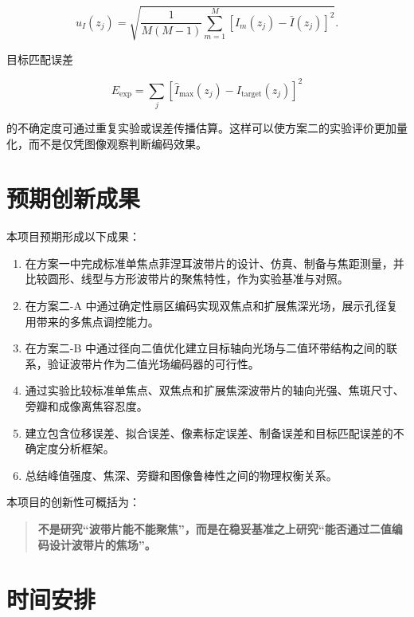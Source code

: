 \documentclass[UTF8,a4paper,11pt]{ctexart}
\begin{document}
\[
u_I(z_j)=
\sqrt{
\frac{1}{M(M-1)}
\sum_{m=1}^{M}
\left[
I_m(z_j)-\bar I(z_j)
\right]^2
}.
\]

目标匹配误差

\[
E_{\mathrm{exp}}
=
\sum_j
\left[
\widehat I_{\max}(z_j)
-
I_{\mathrm{target}}(z_j)
\right]^2
\]

的不确定度可通过重复实验或误差传播估算。这样可以使方案二的实验评价更加量化，而不是仅凭图像观察判断编码效果。

\section{预期创新成果}

本项目预期形成以下成果：

\begin{enumerate}[label=(\arabic*)]
\item 在方案一中完成标准单焦点菲涅耳波带片的设计、仿真、制备与焦距测量，并比较圆形、线型与方形波带片的聚焦特性，作为实验基准与对照。
\item 在方案二-A 中通过确定性扇区编码实现双焦点和扩展焦深光场，展示孔径复用带来的多焦点调控能力。
\item 在方案二-B 中通过径向二值优化建立目标轴向光场与二值环带结构之间的联系，验证波带片作为二值光场编码器的可行性。
\item 通过实验比较标准单焦点、双焦点和扩展焦深波带片的轴向光强、焦斑尺寸、旁瓣和成像离焦容忍度。
\item 建立包含位移误差、拟合误差、像素标定误差、制备误差和目标匹配误差的不确定度分析框架。
\item 总结峰值强度、焦深、旁瓣和图像鲁棒性之间的物理权衡关系。
\end{enumerate}

本项目的创新性可概括为：

\begin{quote}
\textbf{不是研究“波带片能不能聚焦”，而是在稳妥基准之上研究“能否通过二值编码设计波带片的焦场”。}
\end{quote}

\section{时间安排}
\end{document}
